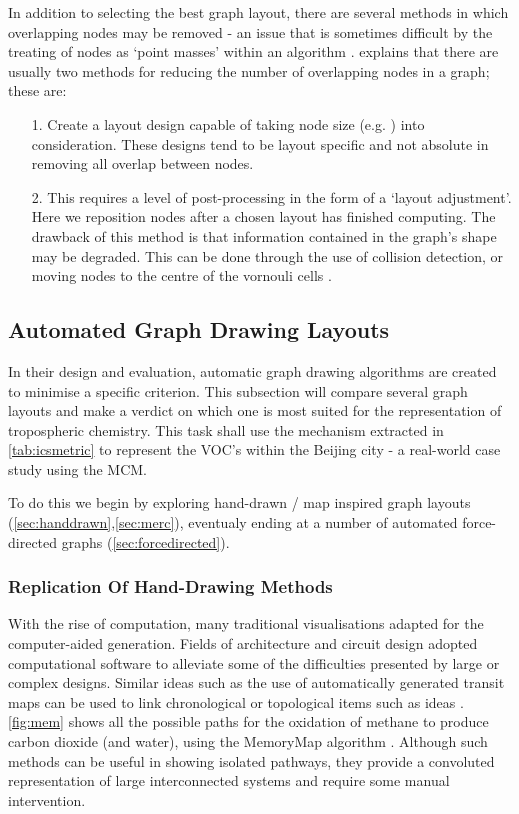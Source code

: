 In addition to selecting the best graph layout, there are several methods in which overlapping nodes may be removed - an issue that is sometimes difficult by the treating of nodes as `point masses' within an algorithm \citep{nodeoverlap}. \cite{IPSEPCOLA} explains that there are usually two methods for reducing the number of overlapping nodes in a graph; these are:


\begin{itemize}
\item [1.] Create a layout design capable of taking node size (e.g. \citep{nons}) into consideration. These designs tend to be layout specific and not absolute in removing all overlap between nodes.
\item [2.] This requires a level of post-processing in the form of a `layout adjustment'. Here we reposition nodes after a chosen layout has finished computing. The drawback of this method is that information contained in the graph's shape may be degraded. This can be done through the use of collision detection, or moving nodes to the centre of the vornouli cells \citep{novern}.
\end{itemize}




\subsection{Automated Graph Drawing Layouts}\label{sec:drawing}


In their design and evaluation, automatic graph drawing algorithms are created to minimise a specific criterion. This subsection will compare several graph layouts and make a verdict on which one is most suited for the representation of tropospheric chemistry. This task shall use the mechanism extracted in \autoref{tab:icsmetric} to represent the VOC's within the Beijing city - a real-world case study using the MCM.

To do this we begin by exploring hand-drawn / map inspired graph layouts \\ (\autoref{sec:handdrawn},\autoref{sec:merc}), eventualy ending at a number of  automated force-directed graphs (\autoref{sec:forcedirected}).


\subsubsection{Replication Of Hand-Drawing Methods}\label{sec:handdrawn}
With the rise of computation, many traditional visualisations adapted for the computer-aided generation. Fields of architecture and circuit design adopted computational software to alleviate some of the difficulties presented by large or complex designs. Similar ideas such as the use of automatically generated transit maps can be used to link chronological or topological items such as ideas \citep{memory}. \autoref{fig:mem} shows all the possible paths for the oxidation of methane to produce carbon dioxide (and water), using the MemoryMap algorithm \cite{memory}. Although such methods can be useful in showing isolated pathways, they provide a convoluted representation of large interconnected systems and require some manual intervention.


